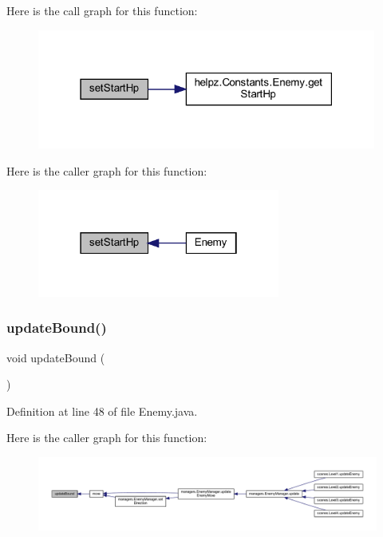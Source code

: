 Here is the call graph for this function\+:\nopagebreak
\begin{figure}[H]
\begin{center}
\leavevmode
\includegraphics[width=316pt]{classenemies_1_1_enemy_a36ff8539de48d58a670cd19251abe658_cgraph}
\end{center}
\end{figure}
Here is the caller graph for this function\+:\nopagebreak
\begin{figure}[H]
\begin{center}
\leavevmode
\includegraphics[width=226pt]{classenemies_1_1_enemy_a36ff8539de48d58a670cd19251abe658_icgraph}
\end{center}
\end{figure}
\mbox{\label{classenemies_1_1_enemy_aff695491d98058a8b62a30d4484083bc}} 
\subsubsection{\texorpdfstring{update\+Bound()}{updateBound()}}
{\footnotesize\ttfamily void update\+Bound (\begin{DoxyParamCaption}{ }\end{DoxyParamCaption})}



Definition at line 48 of file Enemy.\+java.

Here is the caller graph for this function\+:
\nopagebreak
\begin{figure}[H]
\begin{center}
\leavevmode
\includegraphics[width=350pt]{classenemies_1_1_enemy_aff695491d98058a8b62a30d4484083bc_icgraph}
\end{center}
\end{figure}


